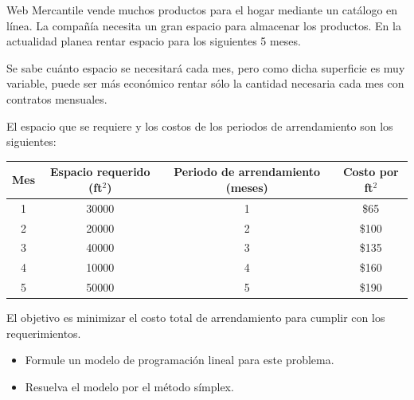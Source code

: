 \begin{Ejer} Web Mercantile vende muchos productos para el hogar mediante un cat\'alogo en l\'inea. La compa\~n\'ia necesita un gran espacio para almacenar los productos. En la actualidad planea rentar espacio para los siguientes 5 meses.

Se sabe cu\'anto espacio se necesitar\'a cada mes, pero como dicha superficie es muy variable, puede ser m\'as econ\'omico rentar s\'olo la cantidad necesaria cada mes con contratos mensuales.

El espacio que se requiere y los costos de los periodos de arrendamiento son los siguientes:

\begin{center}
\begin{tabular}{cccc}
Mes & Espacio requerido (ft$^2$) & Periodo de arrendamiento (meses) & Costo por ft$^2$ \\
\hline
1 & 30000 & 1 & \$65 \\
2 & 20000 & 2 & \$100 \\
3 & 40000 & 3 & \$135 \\
4 & 10000 & 4 & \$160 \\
5 & 50000 & 5 & \$190
\end{tabular}
\end{center}

El objetivo es minimizar el costo total de arrendamiento para cumplir con los requerimientos.

\begin{itemize}
\item[a)] Formule un modelo de programaci\'on lineal para este problema.
\item[b)] Resuelva el modelo por el m\'etodo s\'implex.
\end{itemize}

\end{Ejer}


